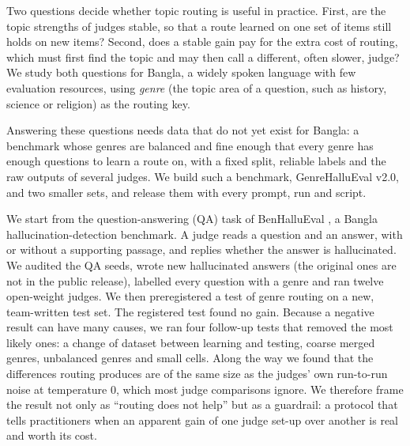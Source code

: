 \documentclass[11pt]{article}
\begin{document}
Two questions decide whether topic routing is useful in practice. First, are the topic strengths of judges stable, so
that a route learned on one set of items still holds on new items? Second, does a stable gain pay for the extra cost
of routing, which must first find the topic and may then call a different, often slower, judge? We study both
questions for Bangla, a widely spoken language with few evaluation resources, using \emph{genre} (the topic area of a
question, such as history, science or religion) as the routing key.

Answering these questions needs data that do not yet exist for Bangla: a benchmark whose genres are balanced
and fine enough that every genre has enough questions to learn a route on, with a fixed split, reliable labels and the
raw outputs of several judges. We build such a benchmark, GenreHalluEval v2.0, and two smaller sets, and release them
with every prompt, run and script.

We start from the question-answering (QA) task of BenHalluEval \citep{benhallueval}, a Bangla hallucination-detection
benchmark. A judge reads a question and an answer, with or without a supporting passage, and replies whether the
answer is hallucinated. We audited the QA seeds, wrote new hallucinated answers (the original ones are not in the
public release), labelled every question with a genre and ran twelve open-weight judges. We then preregistered a test
of genre routing on a new, team-written test set. The registered test found no gain. Because a negative result can
have many causes, we ran four follow-up tests that removed the most likely ones: a change of dataset between learning
and testing, coarse merged genres, unbalanced genres and small cells. Along the way we found that the
differences routing produces are of the same size as the judges' own run-to-run noise at temperature 0, which most
judge comparisons ignore. We therefore frame the result not only as ``routing does not help'' but as a guardrail: a
protocol that tells practitioners when an apparent gain of one judge set-up over another is real and worth its cost.
\end{document}
